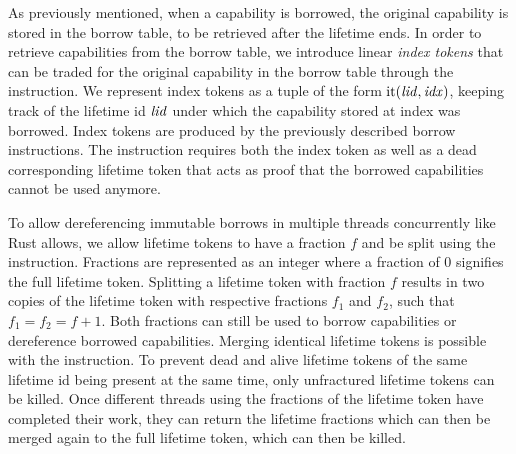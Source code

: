 As previously mentioned, when a capability is borrowed, the original capability is stored in the borrow table, to be retrieved after the lifetime ends.
In order to retrieve capabilities from the borrow table, we introduce linear \emph{index tokens} that can be traded for the original capability in the borrow table through the  instruction.
We represent index tokens as a tuple of the form $\mathrm{it}(\mathit{lid},\mathit{idx})$, keeping track of the lifetime id $\mathit{lid}$ under which the capability stored at index  was borrowed.
Index tokens are produced by the previously described borrow instructions.
The  instruction requires both the index token as well as a dead corresponding lifetime token that acts as proof that the borrowed capabilities cannot be used anymore.

To allow dereferencing immutable borrows in multiple threads concurrently like Rust allows, we allow lifetime tokens to have a fraction $f$ and be split using the  instruction.
Fractions are represented as an integer where a fraction of 0 signifies the full lifetime token.
Splitting a lifetime token with fraction $f$ results in two copies of the lifetime token with respective fractions $f_1$ and $f_2$, such that $f_1 = f_2 = f + 1$.
Both fractions can still be used to borrow capabilities or dereference borrowed capabilities.
Merging identical lifetime tokens is possible with the  instruction.
To prevent dead and alive lifetime tokens of the same lifetime id being present at the same time, only unfractured lifetime tokens can be killed.
Once different threads using the fractions of the lifetime token have completed their work, they can return the lifetime fractions which can then be merged again to the full lifetime token, which can then be killed.

